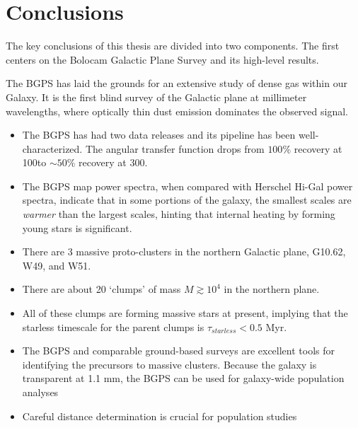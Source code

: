 
\chapter{Conclusions}
\label{ch:conclusion}
The key conclusions of this thesis are divided into two components.  The first
centers on the Bolocam Galactic Plane Survey and its high-level results.

The BGPS has laid the grounds for an extensive study of dense gas within our
Galaxy.  It is the first blind survey of the Galactic plane at millimeter
wavelengths, where optically thin dust emission dominates the observed signal.

\begin{itemize}
    \item The BGPS has had two data releases and its
        pipeline has been well-characterized.  The angular transfer function drops
        from $100\%$ recovery at 100\arcsec to $\sim50\%$ recovery at 300\arcsec.
    \item The BGPS map power spectra, when compared with Herschel Hi-Gal power
        spectra, indicate that in some portions of the galaxy, the smallest
        scales are \emph{warmer} than the largest scales, hinting that internal
        heating by forming young stars is significant.
    \item There are 3 massive proto-clusters in the northern Galactic plane, 
        G10.62, W49, and W51.
    \item There are about 20 `clumps' of mass $M\gtrsim10^4$ \msun in the northern
        plane.
    \item All of these clumps are forming massive stars at present, implying that
        the starless timescale for the parent clumps is $\tau_{starless}<0.5$ Myr.
    \item The BGPS and comparable ground-based surveys are excellent tools for
        identifying the precursors to massive clusters.  Because the galaxy is transparent
        at 1.1 mm, the BGPS can be used for galaxy-wide population analyses
    \item Careful distance determination is crucial for population studies
\end{itemize}



